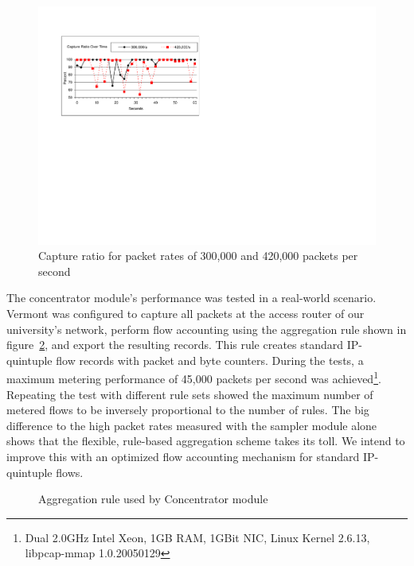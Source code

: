 \begin{figure}
\begin{center}
\includegraphics[scale=0.7]{gfx/sampler-perf3.pdf}
\caption{Capture ratio for packet rates of 300,000 and 420,000 packets per second}
\label{fig_perf_sampler}
\end{center}
\end{figure}

The concentrator module's performance was tested in a real-world scenario.
Vermont was configured to capture all packets at the access router of our university's network, perform flow accounting using the aggregation rule shown in figure~\ref{fig_rule}, and export the resulting records.
This rule creates standard IP-quintuple flow records with packet and byte counters.
During the tests, a maximum metering performance of 45,000 packets per second was achieved\footnote{Dual 2.0GHz Intel Xeon, 1GB RAM, 1GBit NIC, Linux Kernel 2.6.13, libpcap-mmap 1.0.20050129}. 
Repeating the test with different rule sets showed the maximum number of metered flows to be inversely proportional to the number of rules.
The big difference to the high packet rates measured with the sampler module alone shows that the flexible, rule-based aggregation scheme takes its toll.
We intend to improve this with an optimized flow accounting mechanism for standard IP-quintuple flows. 

\begin{figure}
\centering
{}
\caption{Aggregation rule used by Concentrator module}
\label{fig_rule}
\end{figure}


